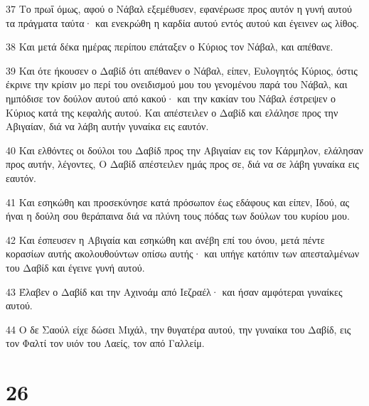 \par 37 Το πρωΐ όμως, αφού ο Νάβαλ εξεμέθυσεν, εφανέρωσε προς αυτόν η γυνή αυτού τα πράγματα ταύτα· και ενεκρώθη η καρδία αυτού εντός αυτού και έγεινεν ως λίθος.
\par 38 Και μετά δέκα ημέρας περίπου επάταξεν ο Κύριος τον Νάβαλ, και απέθανε.
\par 39 Και ότε ήκουσεν ο Δαβίδ ότι απέθανεν ο Νάβαλ, είπεν, Ευλογητός Κύριος, όστις έκρινε την κρίσιν μο περί του ονειδισμού μου του γενομένου παρά του Νάβαλ, και ημπόδισε τον δούλον αυτού από κακού· και την κακίαν του Νάβαλ έστρεψεν ο Κύριος κατά της κεφαλής αυτού. Και απέστειλεν ο Δαβίδ και ελάλησε προς την Αβιγαίαν, διά να λάβη αυτήν γυναίκα εις εαυτόν.
\par 40 Και ελθόντες οι δούλοι του Δαβίδ προς την Αβιγαίαν εις τον Κάρμηλον, ελάλησαν προς αυτήν, λέγοντες, Ο Δαβίδ απέστειλεν ημάς προς σε, διά να σε λάβη γυναίκα εις εαυτόν.
\par 41 Και εσηκώθη και προσεκύνησε κατά πρόσωπον έως εδάφους και είπεν, Ιδού, ας ήναι η δούλη σου θεράπαινα διά να πλύνη τους πόδας των δούλων του κυρίου μου.
\par 42 Και έσπευσεν η Αβιγαία και εσηκώθη και ανέβη επί του όνου, μετά πέντε κορασίων αυτής ακολουθούντων οπίσω αυτής· και υπήγε κατόπιν των απεσταλμένων του Δαβίδ και έγεινε γυνή αυτού.
\par 43 Έλαβεν ο Δαβίδ και την Αχινοάμ από Ιεζραέλ· και ήσαν αμφότεραι γυναίκες αυτού.
\par 44 Ο δε Σαούλ είχε δώσει Μιχάλ, την θυγατέρα αυτού, την γυναίκα του Δαβίδ, εις τον Φαλτί τον υιόν του Λαείς, τον από Γαλλείμ.

\chapter{26}

